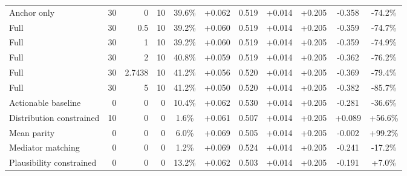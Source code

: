 \begin{table}[htbp]
\begin{tabular}{lrrrccccccc}
Anchor only & 30 & 0 & 10 & 39.6\% & +0.062 & 0.519 & +0.014 & +0.205 & -0.358 & -74.2\% \\
Full & 30 & 0.5 & 10 & 39.2\% & +0.060 & 0.519 & +0.014 & +0.205 & -0.359 & -74.7\% \\
Full & 30 & 1 & 10 & 39.2\% & +0.060 & 0.519 & +0.014 & +0.205 & -0.359 & -74.9\% \\
Full & 30 & 2 & 10 & 40.8\% & +0.059 & 0.519 & +0.014 & +0.205 & -0.362 & -76.2\% \\
Full & 30 & 2.7438 & 10 & 41.2\% & +0.056 & 0.520 & +0.014 & +0.205 & -0.369 & -79.4\% \\
Full & 30 & 5 & 10 & 41.2\% & +0.050 & 0.520 & +0.014 & +0.205 & -0.382 & -85.7\% \\
Actionable baseline & 0 & 0 & 0 & 10.4\% & +0.062 & 0.530 & +0.014 & +0.205 & -0.281 & -36.6\% \\
Distribution constrained & 10 & 0 & 0 & 1.6\% & +0.061 & 0.507 & +0.014 & +0.205 & +0.089 & +56.6\% \\
Mean parity & 0 & 0 & 0 & 6.0\% & +0.069 & 0.505 & +0.014 & +0.205 & -0.002 & +99.2\% \\
Mediator matching & 0 & 0 & 0 & 1.2\% & +0.069 & 0.524 & +0.014 & +0.205 & -0.241 & -17.2\% \\
Plausibility constrained & 0 & 0 & 0 & 13.2\% & +0.062 & 0.503 & +0.014 & +0.205 & -0.191 & +7.0\% \\
\bottomrule
\end{tabular}
\end{table}